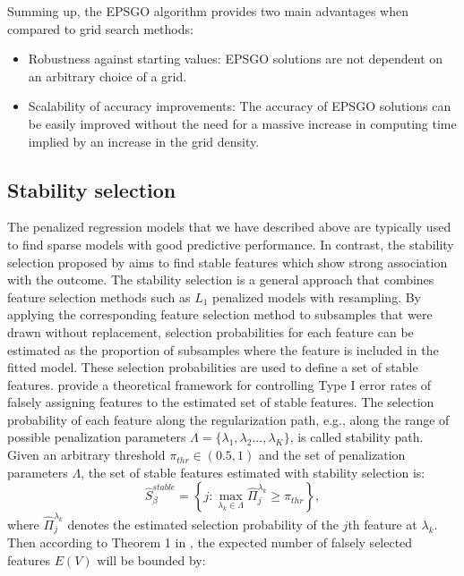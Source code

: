 \documentclass[nojss]{jss}
\begin{document}
Summing up, the EPSGO algorithm provides two main advantages when compared to grid search methods: 
\begin{itemize}
\item Robustness against starting values: EPSGO solutions are not dependent on an arbitrary choice of a grid.
\item Scalability of accuracy improvements: The accuracy of EPSGO solutions can be easily improved without the need for a massive increase in computing time implied by an increase in the grid density.
\end{itemize}

\subsection{Stability selection}
The penalized regression models that we have described above are typically used to find sparse models with good predictive performance. In contrast, the stability selection proposed by \citet{MeinshausenBuehlmann2010} aims to find stable features which show strong association with the outcome. 
The stability selection is a general approach that combines feature selection methods such as $L_1$ penalized models with resampling. By applying the corresponding feature selection method to subsamples that were drawn without replacement, selection probabilities for each feature can be estimated as the proportion of subsamples where the feature is included in the fitted model. These selection probabilities are used to define a set of stable features. \citet{MeinshausenBuehlmann2010} provide a theoretical framework for controlling Type I error rates of falsely assigning features to the estimated set of stable features. The selection probability of each feature along the regularization path, e.g., along the range of possible penalization parameters $\Lambda=\{\lambda_1,\lambda_2...,\lambda_K\}$, is called stability path.
Given an arbitrary threshold $\pi_{thr} \in (0.5,1)$ and the set of penalization parameters $\Lambda$, the set of stable features estimated with stability selection is:
\begin{equation} 
 \hat{S}_{\beta}^{stable}=\left\{j: \max_{\lambda_{k} \in \Lambda} \hat{\Pi}_{j}^{\lambda_{k}} \geq \pi_{thr} \right\},
\end{equation}
where $\hat{\Pi}_{j}^{\lambda_{k}}$ denotes the estimated selection probability of the $j$th feature at $\lambda_k$. 
Then according to Theorem 1 in \citet{MeinshausenBuehlmann2010}, the expected number of falsely selected features $E(V)$ will be bounded by:
\end{document}
